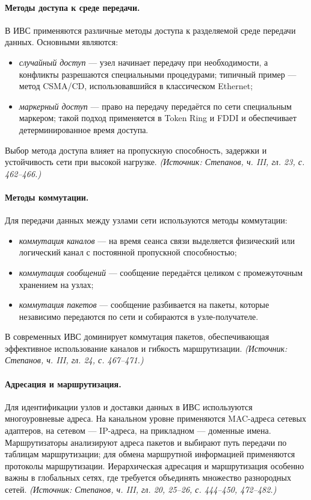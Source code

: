 \documentclass[a4paper,12pt]{article}
\begin{document}
\paragraph{Методы доступа к среде передачи.}
В ИВС применяются различные методы доступа к разделяемой среде передачи данных. Основными являются:
\begin{itemize}
\item \emph{случайный доступ} — узел начинает передачу при необходимости, а конфликты разрешаются специальными процедурами; типичный пример — метод CSMA/CD, использовавшийся в классическом Ethernet;
\item \emph{маркерный доступ} — право на передачу передаётся по сети специальным маркером; такой подход применяется в Token Ring и FDDI и обеспечивает детерминированное время доступа.
\end{itemize}
Выбор метода доступа влияет на пропускную способность, задержки и устойчивость сети при высокой нагрузке.
\textit{(Источник: Степанов, ч. III, гл. 23, с. 462–466.)}

\paragraph{Методы коммутации.}
Для передачи данных между узлами сети используются методы коммутации:
\begin{itemize}
\item \emph{коммутация каналов} — на время сеанса связи выделяется физический или логический канал с постоянной пропускной способностью;
\item \emph{коммутация сообщений} — сообщение передаётся целиком с промежуточным хранением на узлах;
\item \emph{коммутация пакетов} — сообщение разбивается на пакеты, которые независимо передаются по сети и собираются в узле-получателе.
\end{itemize}
В современных ИВС доминирует коммутация пакетов, обеспечивающая эффективное использование каналов и гибкость маршрутизации.
\textit{(Источник: Степанов, ч. III, гл. 24, с. 467–471.)}

\paragraph{Адресация и маршрутизация.}
Для идентификации узлов и доставки данных в ИВС используются многоуровневые адреса. На канальном уровне применяются MAC-адреса сетевых адаптеров, на сетевом — IP-адреса, на прикладном — доменные имена. Маршрутизаторы анализируют адреса пакетов и выбирают путь передачи по таблицам маршрутизации; для обмена маршрутной информацией применяются протоколы маршрутизации. Иерархическая адресация и маршрутизация особенно важны в глобальных сетях, где требуется объединять множество разнородных сетей.
\textit{(Источник: Степанов, ч. III, гл. 20, 25–26, с. 444–450, 472–482.)}
\end{document}
